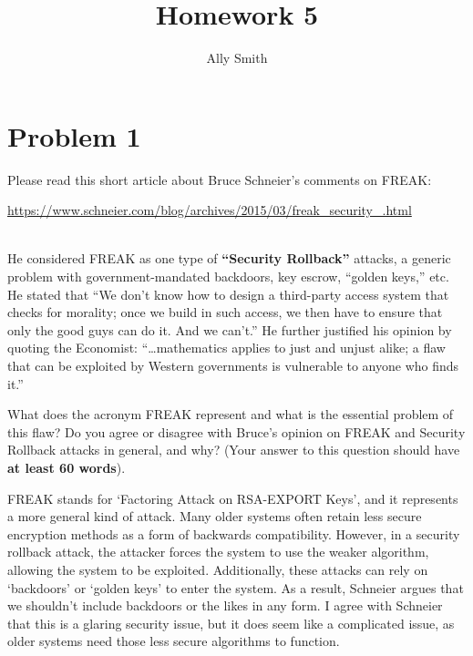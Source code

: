 \documentclass[11pt]{article}
\author{Ally Smith}
\title{Homework 5}
\begin{document}
\maketitle

\section*{Problem 1}
Please read this short article about Bruce Schneier's comments on FREAK:
\begin{minipage}{.9\textwidth}
    \url{https://www.schneier.com/blog/archives/2015/03/freak_security_.html}
\end{minipage}\\

He considered FREAK as one type of \textbf{``Security Rollback''} attacks, a
generic problem with government-mandated backdoors, key escrow, ``golden
keys,''
etc. He stated that ``We don't know how to design a third-party access system
that checks for morality; once we build in such access, we then have to ensure
that only the good guys can do it. And we can't.'' He further justified his
opinion by quoting the Economist: ``\ldots mathematics applies to just and
unjust alike; a flaw that can be exploited by Western governments is vulnerable
to anyone who finds it.''

What does the acronym FREAK represent and what is the essential problem of this
flaw? Do you agree or disagree with Bruce's opinion on FREAK and Security
Rollback attacks in general, and why? (Your answer to this question should have
\textbf{at least 60 words}).

\vspace*{.5in}

FREAK stands for `Factoring Attack on RSA-EXPORT Keys', and it represents a more
general kind of attack. Many older systems often retain less secure encryption
methods as a form of backwards compatibility. However, in a security rollback
attack, the attacker forces the system to use the weaker algorithm, allowing the
system to be exploited. Additionally, these attacks can rely on `backdoors' or
`golden keys' to enter the system. As a result, Schneier argues that we
shouldn't include backdoors or the likes in any form. I agree with Schneier that
this is a glaring security issue, but it does seem like a complicated issue, as
older systems need those less secure algorithms to function.

\clearpage
\end{document}
